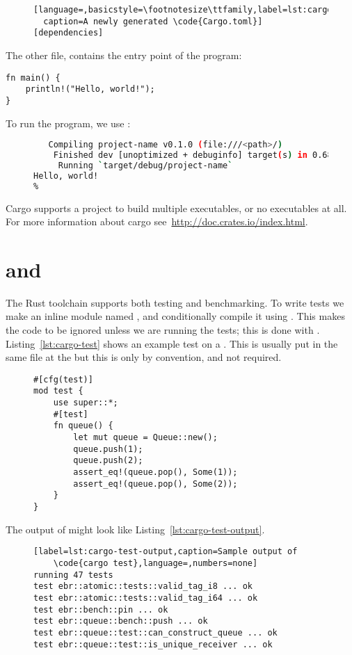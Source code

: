 \documentclass[b5paper]{report}
\begin{document}
\begin{appendices}
\begin{figure}[ht]
\begin{lstlisting}[language=,basicstyle=\footnotesize\ttfamily,label=lst:cargo.toml,
  caption=A newly generated \code{Cargo.toml}]
[dependencies]
  \end{lstlisting}
\end{figure}
  The other file,  contains the entry point of the program:
  \begin{lstlisting}
fn main() {
    println!("Hello, world!");
}
  \end{lstlisting}

  To run the program, we use \cargo{}:
  \begin{figure}[ht]
  \begin{lstlisting}[language=Bash,numbers=none]
% cargo run
   Compiling project-name v0.1.0 (file:///<path>/)
    Finished dev [unoptimized + debuginfo] target(s) in 0.68 secs
     Running `target/debug/project-name`
Hello, world!
%
  \end{lstlisting}
\end{figure}

  Cargo supports a project to build multiple executables, or no executables at all.
  For more information about cargo see~\url{http://doc.crates.io/index.html}.

  \section{\code{\#[test]} and \code{\#[bench]}}
  \label{sec:rust-test}
  The Rust toolchain supports both testing and benchmarking. To write tests we
  make an inline module named , and conditionally compile it using
  . This makes the code to be ignored unless we are running
  the tests; this is done with . Listing~\ref{lst:cargo-test}
  shows an example test on a . This is usually put in the same file
  at the  but this is only by convention, and not required.

  \begin{figure}[ht!]
  \begin{lstlisting}[label=lst:cargo-test,caption=An example test in Rust]
#[cfg(test)]
mod test {
    use super::*;
    #[test]
    fn queue() {
        let mut queue = Queue::new();
        queue.push(1);
        queue.push(2);
        assert_eq!(queue.pop(), Some(1));
        assert_eq!(queue.pop(), Some(2));
    }
}
    \end{lstlisting}
  \end{figure}
  The output of  might look like
  Listing~\ref{lst:cargo-test-output}.
  \begin{figure}[ht!]
    \begin{lstlisting}[label=lst:cargo-test-output,caption=Sample output of
    \code{cargo test},language=,numbers=none]
running 47 tests
test ebr::atomic::tests::valid_tag_i8 ... ok
test ebr::atomic::tests::valid_tag_i64 ... ok
test ebr::bench::pin ... ok
test ebr::queue::bench::push ... ok
test ebr::queue::test::can_construct_queue ... ok
test ebr::queue::test::is_unique_receiver ... ok
    \end{lstlisting}
  \end{figure}


\end{appendices}
\end{document}
